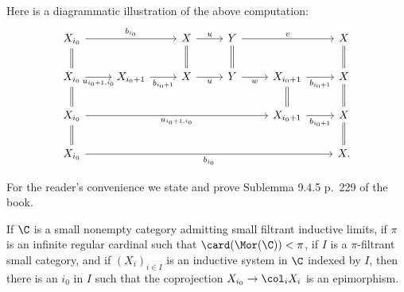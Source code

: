 \documentclass[12pt]{article}
\theoremstyle{remark}
\theoremstyle{definition}
\begin{document}
Here is a diagrammatic illustration of the above computation:
$$
\begin{tikzcd}
X_{i_0}\ar[equal]{d}\ar{rr}{b_{i_0}}&&X\ar[equal]{d}\ar{r}{u}&Y\ar[equal]{d}\ar{rr}{v}&&X\ar[equal]{d}\\ 
X_{i_0}\ar[equal]{d}\ar{r}[swap]{u_{i_0+1,i_0}}&X_{i_0+1}\ar{r}[swap]{b_{i_0+1}}&X\ar{r}[swap]{u}&Y\ar{r}[swap]{w}&X_{i_0+1}\ar[equal]{d}\ar{r}[swap]{b_{i_0+1}}&X\ar[equal]{d}\\ 
X_{i_0}\ar[equal]{d}\ar{rrrr}[swap]{u_{i_0+1,i_0}}&&&&X_{i_0+1}\ar{r}[swap]{b_{i_0+1}}&X\ar[equal]{d}\\ 
X_{i_0}\ar{rrrrr}[swap]{b_{i_0}}&&&&&X.
\end{tikzcd}
$$ 

For the reader's convenience we state and prove Sublemma 9.4.5 p.~229 of the book.

\begin{lem}[Sublemma 9.4.5 p.~229]
If $\C$ is a small nonempty category admitting small filtrant inductive limits, if $\pi$ is an infinite regular cardinal such that $\card(\Mor(\C))<\pi$, if $I$ is a $\pi$-filtrant small category, and if $(X_i)_{i\in I}$ is an inductive system in $\C$ indexed by $I$, then there is an $i_0$ in $I$ such that the coprojection $X_{i_0}\to\col_iX_i$ is an epimorphism. 
\end{lem}
\end{document}
